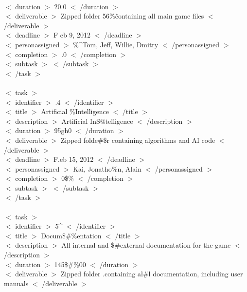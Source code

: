 \documentclass[12pt]{article}
\newcommand{\tab}{\hspace*{2em}}
\begin{document}
{\\ \tab    \tab $<$ duration $>$ 20.0 $<$ /duration $>$ 
\\ \tab    \tab $<$ deliverable $>$ Zipped folder 56\%\^containing all main game files $<$ /deliverable $>$ 
\\ \tab    \tab $<$ deadline $>$ F eb 9, 2012 $<$ /deadline $>$ 
\\ \tab    \tab $<$ personassigned $>$ \%\^{}Tom, Jeff, Willie, Dmitry $<$ /personassigned $>$ 
\\ \tab    \tab $<$ completion $>$ .0 $<$ /completion $>$ 
\\ \tab    \tab $<$ subtask $>$  $<$ /subtask $>$ 
\\ \tab$<$ /task $>$ 
\\ 
\\ \tab$<$ task $>$ 
\\ \tab    \tab $<$ identifier $>$ .4 $<$ /identifier $>$ 
\\ \tab    \tab $<$ title $>$ Artificial \%Intelligence $<$ /title $>$ 
\\ \tab    \tab $<$ description $>$ Artificial InS@telligence $<$ /description $>$ 
\\ \tab    \tab $<$ duration $>$ 95gh0 $<$ /duration $>$ 
\\ \tab    \tab $<$ deliverable $>$ Zipped folde\#\$r containing algorithms and AI code $<$ /deliverable $>$ 
\\ \tab    \tab $<$ deadline $>$ F.eb 15, 2012 $<$ /deadline $>$ 
\\ \tab    \tab $<$ personassigned $>$ Kai, Jonatho\%n, Alain $<$ /personassigned $>$ 
\\ \tab    \tab $<$ completion $>$ 0\$\% $<$ /completion $>$ 
\\ \tab    \tab $<$ subtask $>$  $<$ /subtask $>$ 
\\ \tab$<$ /task $>$ 
\\ 
\\ \tab$<$ task $>$ 
\\ \tab    \tab $<$ identifier $>$ 5\^{} $<$ /identifier $>$ 
\\ \tab    \tab $<$ title $>$ Docum\$\#\%entation $<$ /title $>$ 
\\ \tab    \tab $<$ description $>$ All internal and \$\#external documentation for the game $<$ /description $>$ 
\\ \tab    \tab $<$ duration $>$ 145\$\#\%00 $<$ /duration $>$ 
\\ \tab    \tab $<$ deliverable $>$ Zipped folder .containing al\#l documentation, including user manuals $<$ /deliverable $>$ 
}
\end{document}
